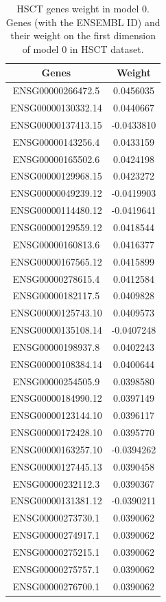\documentclass[
  12pt,
  a4paper,
  twoside,
  openright]{book}
\begin{document}
\begin{longtable}[t]{cc}
\caption[HSCT genes weight in model 0]{\label{tab:hsct-genes}HSCT genes weight in model 0. Genes (with the ENSEMBL ID) and their weight on the first dimension of model 0 in HSCT dataset.}\\
\toprule
Genes & Weight\\
\midrule
ENSG00000266472.5 & 0.0456035\\
ENSG00000130332.14 & 0.0440667\\
ENSG00000137413.15 & -0.0433810\\
ENSG00000143256.4 & 0.0433159\\
ENSG00000165502.6 & 0.0424198\\
\addlinespace
ENSG00000129968.15 & 0.0423272\\
ENSG00000049239.12 & -0.0419903\\
ENSG00000114480.12 & -0.0419641\\
ENSG00000129559.12 & 0.0418544\\
ENSG00000160813.6 & 0.0416377\\
\addlinespace
ENSG00000167565.12 & 0.0415899\\
ENSG00000278615.4 & 0.0412584\\
ENSG00000182117.5 & 0.0409828\\
ENSG00000125743.10 & 0.0409573\\
ENSG00000135108.14 & -0.0407248\\
\addlinespace
ENSG00000198937.8 & 0.0402243\\
ENSG00000108384.14 & 0.0400644\\
ENSG00000254505.9 & 0.0398580\\
ENSG00000184990.12 & 0.0397149\\
ENSG00000123144.10 & 0.0396117\\
\addlinespace
ENSG00000172428.10 & 0.0395770\\
ENSG00000163257.10 & -0.0394262\\
ENSG00000127445.13 & 0.0390458\\
ENSG00000232112.3 & 0.0390367\\
ENSG00000131381.12 & -0.0390211\\
\addlinespace
ENSG00000273730.1 & 0.0390062\\
ENSG00000274917.1 & 0.0390062\\
ENSG00000275215.1 & 0.0390062\\
ENSG00000275757.1 & 0.0390062\\
ENSG00000276700.1 & 0.0390062\\
\bottomrule
\end{longtable}
\end{document}
